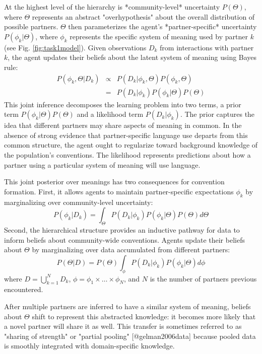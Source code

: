 \documentclass[11pt, floatsintext]{apa6}
\begin{document}
At the highest level of the hierarchy is *community-level* uncertainty $P(\Theta)$, where $\Theta$ represents an abstract "overhypothesis" about the overall distribution of possible partners. 
$\Theta$ then parameterizes the agent's *partner-specific* uncertainty $P(\phi_{k} | \Theta)$, where $\phi_k$ represents the specific system of meaning used by partner $k$ (see Fig. \ref{fig:task1model}). 
Given observations $D_k$ from interactions with partner $k$, the agent updates their beliefs about the latent system of meaning using Bayes rule:
\begin{equation}
\begin{array}{rcl}
P(\phi_k, \Theta | D_k)  & \propto &  P(D_k | \phi_k, \Theta) P(\phi_k, \Theta) \\
                           & =   & P(D_k | \phi_k) P(\phi_k | \Theta) P(\Theta)
\end{array}
\end{equation}
This joint inference decomposes the learning problem into two terms, a prior term $P(\phi_k | \Theta)P(\Theta)$ and a likelihood term $P(D_k | \phi_k)$.
The prior captures the idea that different partners may share aspects of meaning in common.
In the absence of strong evidence that partner-specific language use departs from this common structure, the agent ought to regularize toward background knowledge of the population's conventions.
The likelihood represents predictions about how a partner using a particular system of meaning will use language.

This joint posterior over meanings has two consequences for convention formation.
First, it allows agents to maintain partner-specific expectations $\phi_k$ by marginalizing over community-level uncertainty:
\begin{equation}
P(\phi_k | D_k) = \int_{\Theta}P(D_k | \phi_k) P(\phi_k | \Theta) P(\Theta)  d\Theta
\end{equation}
Second, the hierarchical structure provides an inductive pathway for data to inform beliefs about community-wide conventions.
Agents update their beliefs about $\Theta$ by marginalizing over data accumulated from different partners:
\begin{equation}
P(\Theta | D) = P(\Theta) \int_{\phi} P(D_k | \phi_k) P(\phi_k | \Theta) d\phi
\end{equation}
where $D = \bigcup_{k=1}^N D_k$, $\phi = \phi_1 \times \dots \times \phi_N$, and $N$ is the number of partners previous encountered. 

After multiple partners are inferred to have a similar system of meaning, beliefs about $\Theta$ shift to represent this abstracted knowledge: it becomes more likely that a novel partner will share it as well.
This transfer is sometimes referred to as "sharing of strength" or "partial pooling" [@gelman2006data] because pooled data is smoothly integrated with domain-specific knowledge.
\end{document}
